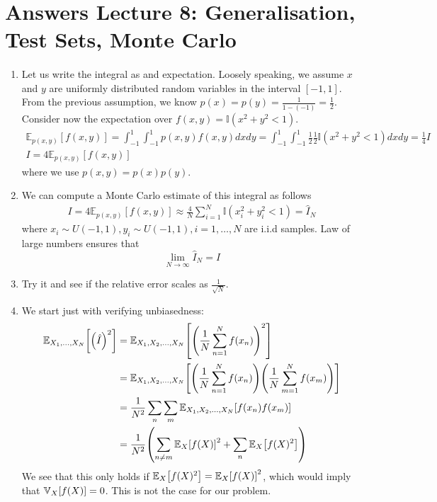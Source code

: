 \section{Answers Lecture 8: Generalisation, Test Sets, Monte Carlo}

\paragraph{}
\begin{enumerate}[label=\alph*.]
\item Let us write the integral as and expectation. Loosely speaking, we assume $x$ and $y$ are uniformly distributed random variables in the interval $[-1,1]$. From the previous assumption, we know $p(x) = p(y) = \frac{1}{1 - (-1)} = \frac{1}{2}$. Consider now the expectation over $f(x,y) = \mathbb{I}(x^2 + y^2 < 1)$.
\begin{align}
\mathbb{E}_{p(x,y)}\left[f(x,y)\right] = \int_{-1}^{1}\int_{-1}^{1}p(x,y)f(x,y)dxdy = \int_{-1}^{1}\int_{-1}^{1}\frac{1}{2}\frac{1}{2}\mathbb{I}(x^2 + y^2 < 1)dxdy = \frac{1}{4}I\\
I = 4\mathbb{E}_{p(x,y)}\left[f(x,y)\right]
\end{align}
where we use $p(x,y) = p(x)p(y)$.

\item We can compute a Monte Carlo estimate of this integral as follows
\begin{align}
I = 4\mathbb{E}_{p(x,y)}\left[f(x,y)\right] \approx \frac{4}{N}\sum_{i=1}^N \mathbb{I}(x_i^2 + y_i^2 < 1) = \hat{I}_N
\end{align}
where $x_i\sim U(-1,1), y_i\sim U(-1,1), i=1,\dots,N$ are i.i.d samples. Law of large numbers ensures that 
\begin{equation}
\lim_{N\rightarrow\infty}\hat{I}_N = I
\end{equation}

\item Try it and see if the relative error scales as $\frac{1}{\sqrt{N}}$.

\item We start just with verifying unbiasedness:
\begin{align}
\Exp{X_1, \dots, X_N}{\left(\hat I\right)^2} &= \Exp{X_1, X_2, \dots, X_N}{\left(\frac{1}{N}\sum_{n=1}^Nf(x_n)\right)^2} \\
&= \Exp{X_1, X_2, \dots, X_N}{\left(\frac{1}{N}\sum_{n=1}^Nf(x_n)\right)\left(\frac{1}{N}\sum_{m=1}^Nf(x_m)\right)} \\
&= \frac{1}{N^2}\sum_n\sum_m\Exp{X_1, X_2, \dots, X_N}{f(x_n)f(x_m)} \\
&= \frac{1}{N^2}\left(\sum_{n\neq m}\Exp{X}{f(X)}^2 + \sum_{n} \Exp{X}{f(X)^2}\right)
\end{align}
We see that this only holds if $\Exp{X}{f(X)^2} = \Exp{X}{f(X)}^2$, which would imply that $\Var{X}{f(X)} = 0$. This is not the case for our problem.


\end{enumerate}

